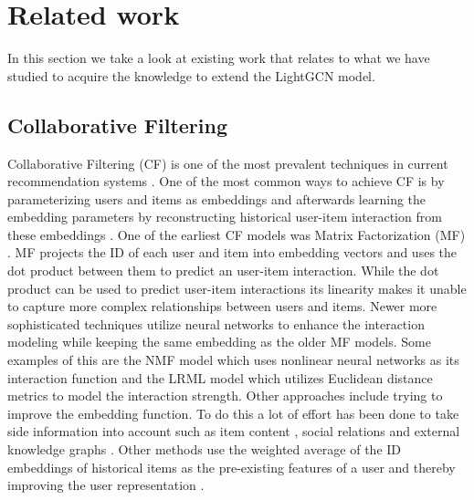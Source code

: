 \section{Related work}
In this section we take a look at existing work that relates to what we have studied to acquire the knowledge to extend the LightGCN model.

\subsection{Collaborative Filtering}
Collaborative Filtering (CF) is one of the most prevalent techniques in current recommendation systems \cite{YT_rec,NGCF_2019,Pint_rec,COL_MEM_NET}.
One of the most common ways to achieve CF is by parameterizing users and items as embeddings and afterwards learning the embedding parameters by reconstructing historical user-item interaction from these embeddings \cite{NGCF_2019}.
One of the earliest CF models was Matrix Factorization (MF) \cite{Matrix-factorization-techniques, BAY_PER_RAN}.
MF  projects the ID of each user and item into embedding vectors and uses the dot product between them to predict an user-item interaction.
While the dot product can be used to predict user-item interactions its linearity makes it unable to capture more complex relationships between users and items.
Newer more sophisticated techniques utilize neural networks to enhance the interaction modeling while keeping the same embedding as the older MF models.
Some examples of this are the NMF model \cite{NEU_COL_FIL} which uses nonlinear neural networks as its interaction function and the LRML model \cite{LAT_REL_MET} which utilizes Euclidean distance metrics to model the interaction strength.
Other approaches include trying to improve the embedding function.
To do this a lot of effort has been done to take side information into account such as item content \cite{ATT_COL_FIL_MUL}, social relations \cite{REC_SOC_USE} and external knowledge graphs \cite{KGAT, KNO_GRA_REC}.
Other methods use the weighted average of the ID embeddings of historical items as the pre-existing features of a user and thereby improving the user representation \cite{SVD_PLUSPLUS,FISM}.

